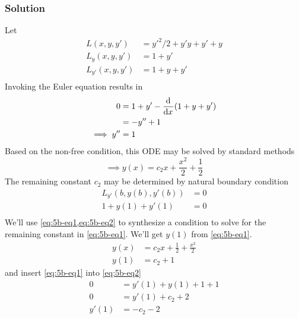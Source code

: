 \documentclass[12pt,twoside]{article}
\begin{document}
\subsubsection*{Solution}
Let
\begin{align*}
  L(x,y,y') &= y'^2/2+y'y+y'+y \\
  L_y(x,y,y') &= 1 + y' \\
  L_{y'}(x,y,y') &= 1 + y + y' \\
\end{align*}
Invoking the Euler equation results in
\begin{equation}
\label{eq:5b-ode}
\begin{aligned}
  0 &= 1 + y' - \frac{\mathrm{d}^{} {}}{\mathrm{d}{x}^{}}(1 + y + y') \\
  &= -y''+1 \\
  \implies y'' &= 1 \\
\end{aligned}
\end{equation}
Based on the non-free condition, this ODE may be solved by standard methods
\begin{equation}
  \label{eq:5b-eq1}
  \implies y(x) = c_2 x+\frac{x^2}{2}+\frac{1}{2}
\end{equation}
The remaining constant $c_2$ may be determined by natural boundary condition
\begin{equation}
  \label{eq:5b-eq2}
  \begin{aligned}
    L_{y'}(b,y(b),y'(b)) &= 0 \\
    1 + y(1) + y'(1) &= 0 \\
  \end{aligned}
\end{equation}
We'll use \cref{eq:5b-eq1,eq:5b-eq2} to synthesize a condition to solve for the
remaining constant in \cref{eq:5b-eq1}. We'll get $y(1)$ from \cref{eq:5b-eq1}.
\begin{equation}
  \label{eq:5b-eq1-eval}
  \begin{aligned}
    y(x) &= c_2x + \frac{1}{2} + \frac{x^2}{2} \\
    y(1) &= c_2 + 1
  \end{aligned}
\end{equation}
and insert \cref{eq:5b-eq1} into \cref{eq:5b-eq2}
\begin{equation}
  \label{eq:5b-yp}
  \begin{aligned}
    0 &= y'(1) + y(1) + 1  + 1 \\
    0 &= y'(1) + c_2 + 2 \\
    y'(1) &= -c_2 - 2 \\
  \end{aligned}
\end{equation}
\end{document}
